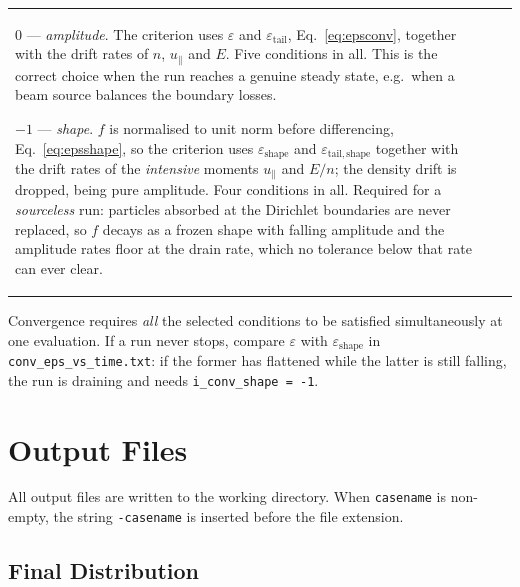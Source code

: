 \documentclass[11pt,a4paper]{article}
\begin{document}
\begin{longtable}{>{\ttfamily}p{3.2cm} p{1.5cm} p{9cm}}
  $0$ --- \emph{amplitude}.  The criterion uses $\varepsilon$ and
  $\varepsilon_\mathrm{tail}$, Eq.~\eqref{eq:epsconv}, together with the drift
  rates of $n$, $u_\parallel$ and $E$.  Five conditions in all.  This is the
  correct choice when the run reaches a genuine steady state, e.g.\ when a beam
  source balances the boundary losses.

  $-1$ --- \emph{shape}.  $f$ is normalised to unit norm before differencing,
  Eq.~\eqref{eq:epsshape}, so the criterion uses $\varepsilon_\mathrm{shape}$ and
  $\varepsilon_\mathrm{tail,shape}$ together with the drift rates of the
  \emph{intensive} moments $u_\parallel$ and $E/n$; the density drift is dropped,
  being pure amplitude.  Four conditions in all.  Required for a
  \emph{sourceless} run: particles absorbed at the Dirichlet boundaries are never
  replaced, so $f$ decays as a frozen shape with falling amplitude and the
  amplitude rates floor at the drain rate, which no tolerance below that rate can
  ever clear. \\[4pt]

\end{longtable}

Convergence requires \emph{all} the selected conditions to be satisfied
simultaneously at one evaluation.  If a run never stops, compare
$\varepsilon$ with $\varepsilon_\mathrm{shape}$ in
\texttt{conv\_eps\_vs\_time.txt}: if the former has flattened while the latter is
still falling, the run is draining and needs \texttt{i\_conv\_shape = -1}.


\section{Output Files}

All output files are written to the working directory.  When \texttt{casename}
is non-empty, the string \texttt{-casename} is inserted before the file
extension.

\subsection{Final Distribution}
\end{document}

